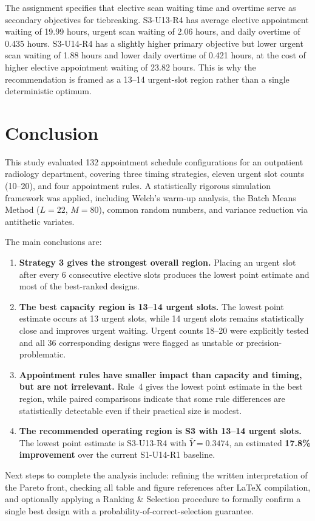 \documentclass[12pt, a4paper]{article}
\begin{document}
The assignment specifies that elective scan waiting time and overtime serve as secondary objectives for tiebreaking. S3-U13-R4 has average elective appointment waiting of 19.99 hours, urgent scan waiting of 2.06 hours, and daily overtime of 0.435 hours. S3-U14-R4 has a slightly higher primary objective but lower urgent scan waiting of 1.88 hours and lower daily overtime of 0.421 hours, at the cost of higher elective appointment waiting of 23.82 hours. This is why the recommendation is framed as a 13--14 urgent-slot region rather than a single deterministic optimum.

\section{Conclusion}

This study evaluated 132 appointment schedule configurations for an outpatient radiology department, covering three timing strategies, eleven urgent slot counts (10--20), and four appointment rules. A statistically rigorous simulation framework was applied, including Welch's warm-up analysis, the Batch Means Method ($L=22$, $M=80$), common random numbers, and variance reduction via antithetic variates.

The main conclusions are:

\begin{enumerate}
    \item \textbf{Strategy 3 gives the strongest overall region.} Placing an urgent slot after every 6 consecutive elective slots produces the lowest point estimate and most of the best-ranked designs.

    \item \textbf{The best capacity region is 13--14 urgent slots.} The lowest point estimate occurs at 13 urgent slots, while 14 urgent slots remains statistically close and improves urgent waiting. Urgent counts 18--20 were explicitly tested and all 36 corresponding designs were flagged as unstable or precision-problematic.

    \item \textbf{Appointment rules have smaller impact than capacity and timing, but are not irrelevant.} Rule~4 gives the lowest point estimate in the best region, while paired comparisons indicate that some rule differences are statistically detectable even if their practical size is modest.

    \item \textbf{The recommended operating region is S3 with 13--14 urgent slots.} The lowest point estimate is S3-U13-R4 with $\bar{Y}=0.3474$, an estimated \textbf{17.8\% improvement} over the current S1-U14-R1 baseline.
\end{enumerate}

Next steps to complete the analysis include: refining the written interpretation of the Pareto front, checking all table and figure references after LaTeX compilation, and optionally applying a Ranking \& Selection procedure to formally confirm a single best design with a probability-of-correct-selection guarantee.
\end{document}
